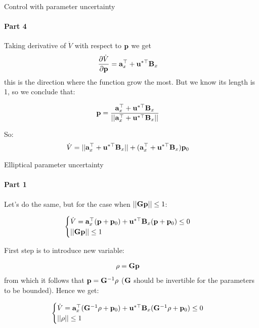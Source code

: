 \documentclass{beamer}
\begin{document}
\begin{frame}{Control with parameter uncertainty}
\framesubtitle{Part 4}
\begin{flushleft}
Taking derivative of $\dot{V}$ with respect to $\mathbf{p}$ we get 
%
\begin{align}
& \frac{\partial \dot{V}}{\partial  \mathbf{p}}  = \mathbf{a}_x^\top  + 
\mathbf{u}^{*\top} \mathbf{B}_x
\end{align}
%
this is the direction where the function grow the most. But we know its length is 1, so we conclude that:

\begin{align}
& \mathbf{p}  = \frac{\mathbf{a}_x^\top  + 
\mathbf{u}^{*\top} \mathbf{B}_x}{|| \mathbf{a}_x^\top  + 
\mathbf{u}^{*\top} \mathbf{B}_x ||}
\end{align}

So:
%
\begin{align}
& \dot{V} = 
|| \mathbf{a}_x^\top  + 
\mathbf{u}^{*\top} \mathbf{B}_x ||
+
(\mathbf{a}_x^\top + 
\mathbf{u}^{*\top} \mathbf{B}_x) \mathbf{p}_0
\end{align}

\end{flushleft}
\end{frame}




\begin{frame}{Elliptical parameter uncertainty}
\framesubtitle{Part 1}
\begin{flushleft}

Let's do the same, but for the case when $||\mathbf{G}\mathbf{p}|| \leq 1$:

\begin{equation}
    \begin{cases}
\dot{V} = \mathbf{a}_x^\top (\mathbf{p} + \mathbf{p}_0) + 
\mathbf{u}^{*\top} \mathbf{B}_x (\mathbf{p} + \mathbf{p}_0) \leq 0 \\
||\mathbf{G}\mathbf{p}|| \leq 1
    \end{cases}
\end{equation}

First step is to introduce new variable:

\begin{align}
& \rho = \mathbf{G}\mathbf{p}
\end{align}
%
from which it follows that $\mathbf{p} = \mathbf{G}^{-1} \rho$ ($\mathbf{G}$ should be invertible for the parameters to be bounded). Hence we get:

\begin{equation}
    \begin{cases}
\dot{V} = \mathbf{a}_x^\top (\mathbf{G}^{-1} \rho + \mathbf{p}_0) + 
\mathbf{u}^{*\top} \mathbf{B}_x (\mathbf{G}^{-1} \rho + \mathbf{p}_0) \leq 0 \\
||\rho|| \leq 1
    \end{cases}
\end{equation}

\end{flushleft}
\end{frame}
\end{document}
